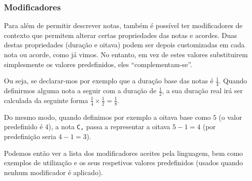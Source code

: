 \subsubsection{\textbf{Modificadores}}

Para além de permitir descrever notas, também é possível ter modificadores de contexto que permitem alterar certas propriedades das notas e acordes. Duas destas propriedades (duração e oitava) podem ser depois customizadas em cada nota ou acorde, como já vimos. No entanto, em vez de estes valores substituirem simplesmente os valores predefinidos, eles ``complementam-se''.

Ou seja, se declarar-mos por exemplo que a duração base das notas é $\frac{1}{4}$. Quando definirmos alguma nota a seguir com a duração de $\frac{1}{2}$, a sua duração real irá ser calculada da seguinte forma $\frac{1}{4} \times \frac{1}{2} = \frac{1}{8}$.

Do mesmo modo, quando definimos por exemplo a oitava base como $5$ (o valor predefinido é $4$), a nota \texttt{C,} passa a representar a oitava $5 - 1 = 4$ (por predefinição seria $4 - 1 = 3$).

Podemos então ver a lista dos modificadores aceites pela linguagem, bem como exemplos de utilização e os seus respetivos valores predefinidos (usados quando nenhum modificador é aplicado).

